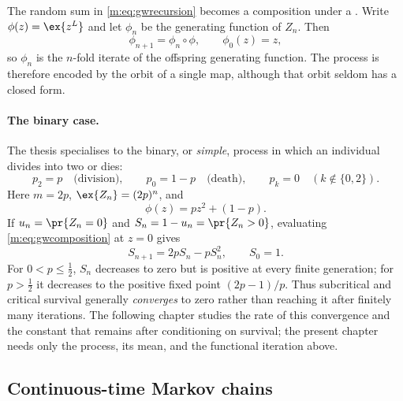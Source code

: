 The random sum in \cref{m:eq:gwrecursion} becomes a composition under a
\pgf{}. Write $\phi(z)=\ex{z^L}$ and let $\phi_n$ be the generating function
of $Z_n$. Then
\begin{equation}
\label{m:eq:gwcomposition}
\phi_{n+1}=\phi_n\circ\phi,
\qquad \phi_0(z)=z,
\end{equation}
so $\phi_n$ is the $n$-fold iterate of the offspring generating function.
The process is therefore encoded by the orbit of a single map, although that
orbit seldom has a closed form.

\paragraph{The binary case.}
The thesis specialises to the binary, or \emph{simple}, process in which an
individual divides into two or dies:
\begin{equation}
\label{m:eq:binarylaw}
p_2=p\quad\text{(division)},
\qquad
p_0=1-p\quad\text{(death)},
\qquad
p_k=0\quad(k\notin\{0,2\}).
\end{equation}
Here $m=2p$, $\ex{Z_n}=(2p)^n$, and
\begin{equation}
\label{m:eq:pgfbinary}
\phi(z)=pz^2+(1-p).
\end{equation}
If $u_n=\pr{Z_n=0}$ and $S_n=1-u_n=\pr{Z_n>0}$, evaluating
\cref{m:eq:gwcomposition} at $z=0$ gives
\begin{equation}
\label{m:eq:SnIter}
S_{n+1}=2pS_n-pS_n^2,
\qquad S_0=1.
\end{equation}
For $0<p\le\tfrac12$, $S_n$ decreases to zero but is positive at every finite
generation; for $p>\tfrac12$ it decreases to the positive fixed point
$(2p-1)/p$. Thus subcritical and critical survival generally \emph{converges}
to zero rather than reaching it after finitely many iterations. The following
chapter studies the rate of this convergence and the constant that remains
after conditioning on survival; the present chapter needs only the process,
its mean, and the functional iteration above.

\FloatBarrier

\subsection{Continuous-time Markov chains}
\label{m:sec:ctmc}

